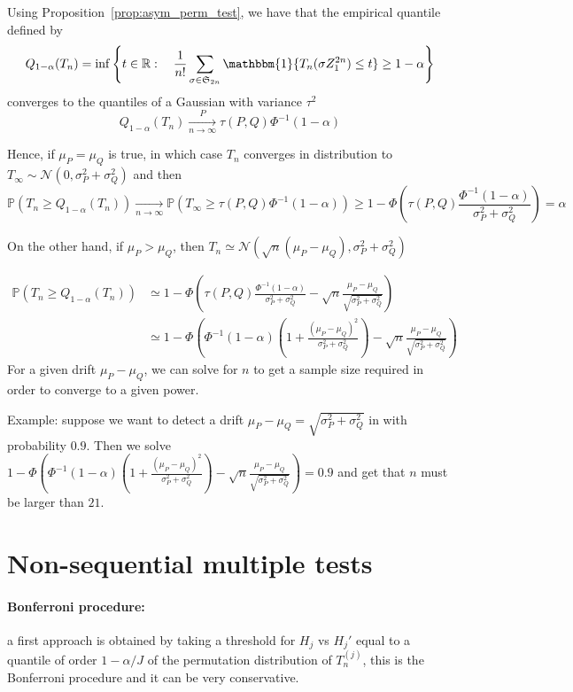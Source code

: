\documentclass{article}
\theoremstyle{plain}
\theoremstyle{remark}
\renewcommand{\P}{\mathbb{P}}
\newcommand{\R}{\mathbb{R}}
\renewcommand{\S}{\mathfrak{S}}
\newcommand{\1}{\mathbbm{1}}
\numberwithin{equation}{section}
\begin{document}
Using Proposition~\ref{prop:asym_perm_test}, we have that the empirical quantile defined by
$$Q_{1-\alpha}(T_n) = \inf\left\{t \in \R:\quad \frac{1}{n!}\sum_{\sigma \in \S_{2n}} \1\{T_n(\sigma Z_{1}^{2n}) \le t\} \ge 1-\alpha\right\} $$
converges to the quantiles of a Gaussian with variance $\tau^2$
$$Q_{1-\alpha}(T_n)\xrightarrow[n \to \infty]{P} \tau(P,Q)\Phi^{-1}(1-\alpha) $$

 Hence, if $\mu_P = \mu_Q$ is true, in which case $T_n$ converges in distribution to $T_\infty\sim \mathcal{N}(0,\sigma_P^2+\sigma_Q^2 )$ and then
$$\P\left( T_n \ge Q_{1-\alpha}(T_n)\right) \xrightarrow[n \to \infty]{} \P(T_\infty\ge \tau(P,Q)\Phi^{-1}(1-\alpha)) \ge  1-\Phi\left(\tau(P,Q)\frac{\Phi^{-1}(1-\alpha)}{\sigma_P^2+\sigma_Q^2 } \right)=\alpha  $$

On the other hand, if $\mu_P > \mu_Q$, then $T_n \simeq \mathcal{N}(\sqrt{n}(\mu_P-\mu_Q),\sigma_P^2+\sigma_Q^2 ) $

\begin{align*}
\P\left( T_n \ge Q_{1-\alpha}(T_n)\right)&\simeq  1-\Phi\left(\tau(P,Q)\frac{\Phi^{-1}(1-\alpha)}{\sigma_P^2+\sigma_Q^2 }-  \sqrt{n}\frac{\mu_P-\mu_Q}{\sqrt{\sigma_P^2+\sigma_Q^2}} \right)  \\
&\simeq  1-\Phi\left(\Phi^{-1}(1-\alpha)\left(1+\frac{(\mu_P-\mu_Q)^2}{\sigma_P^2+\sigma_Q^2 }\right)-  \sqrt{n}\frac{\mu_P-\mu_Q}{\sqrt{\sigma_P^2+\sigma_Q^2}} \right)
\end{align*}
For a given drift $\mu_P-\mu_Q$, we can solve for $n$ to get a sample size required in order to converge to a given power.

Example: suppose we want to detect a drift $\mu_P-\mu_Q=\sqrt{\sigma_P^2+\sigma_Q^2}$ in with probability $0.9$. Then we solve $1-\Phi\left(\Phi^{-1}(1-\alpha)\left(1+\frac{(\mu_P-\mu_Q)^2}{\sigma_P^2+\sigma_Q^2 }\right)-  \sqrt{n}\frac{\mu_P-\mu_Q}{\sqrt{\sigma_P^2+\sigma_Q^2}} \right) = 0.9$ and get that $n$ must be larger than $21$.
\section{Non-sequential multiple tests}

\paragraph{Bonferroni procedure:} a first approach is obtained by taking a threshold for $H_j$ vs $H_j'$ equal to a quantile of order $1-\alpha/J$ of the permutation distribution of $T_n^{(j)}$, this is the Bonferroni procedure and it can be very conservative.
\end{document}
